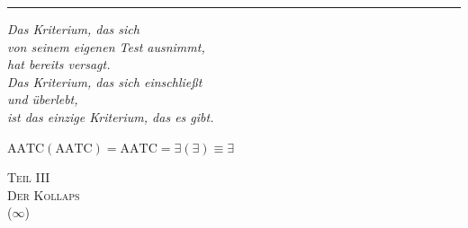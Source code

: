 \documentclass[10pt, openany, oneside]{book}
\renewcommand{\normalsize}{\fontsize{10}{13}\selectfont}
\renewcommand{\large}{\fontsize{11.5}{14}\selectfont}
\renewcommand{\LARGE}{\fontsize{15}{18}\selectfont}
\begin{document}
\vspace{2em}

\begin{center}
    \rule{0.15\textwidth}{0.3pt}
\end{center}

\vspace{0.5em}

\begin{center}
    \itshape
    Das Kriterium, das sich\\
    von seinem eigenen Test ausnimmt,\\
    hat bereits versagt.\\[0.8em]
    Das Kriterium, das sich einschließt\\
    und überlebt,\\
    ist das einzige Kriterium, das es gibt.
\end{center}

\vspace{0.5em}

\begin{center}
    $\text{AATC}(\text{AATC}) = \text{AATC} = \exists(\exists) \equiv \exists$
\end{center}

%
%

\newpage
\thispagestyle{empty}
\vspace*{\fill}
\begin{center}
    {\LARGE\scshape Teil III}\\[1em]
    {\large\scshape Der Kollaps}\\[0.5em]
    {\normalsize ($\infty$)}
\end{center}
\vspace*{\fill}
\newpage

%
%
%
%
\end{document}
